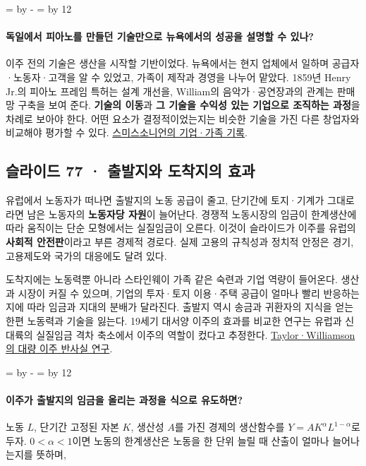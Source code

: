 \documentclass[10pt,a4paper]{article}
\newcommand{\ReserveQuestionSpace}{%
  \par\begingroup
  \dimen0=\pagegoal \advance\dimen0 by -\pagetotal
  \dimen2=\baselineskip \multiply\dimen2 by 12
  \ifdim\dimen0<\dimen2 \newpage\fi
  \endgroup}
\begin{document}
\ReserveQuestionSpace
\paragraph{독일에서 피아노를 만들던 기술만으로 뉴욕에서의 성공을 설명할 수 있나?}
이주 전의 기술은 생산을 시작할 기반이었다. 뉴욕에서는 현지 업체에서 일하며 공급자·노동자·고객을 알 수 있었고, 가족이 제작과 경영을 나누어 맡았다. 1859년 Henry Jr.의 피아노 프레임 특허는 설계 개선을, William의 음악가·공연장과의 관계는 판매망 구축을 보여 준다. \textbf{기술의 이동}과 \textbf{그 기술을 수익성 있는 기업으로 조직하는 과정}을 차례로 보아야 한다. 어떤 요소가 결정적이었는지는 비슷한 기술을 가진 다른 창업자와 비교해야 평가할 수 있다. \href{https://sirismm.si.edu/EADpdfs/NMAH.AC.0178.pdf}{스미스소니언의 기업·가족 기록}.\par

\subsection{슬라이드 77 · 출발지와 도착지의 효과}
유럽에서 노동자가 떠나면 출발지의 노동 공급이 줄고, 단기간에 토지·기계가 그대로라면 남은 노동자의 \textbf{노동자당 자원}이 늘어난다. 경쟁적 노동시장의 임금이 한계생산에 따라 움직이는 단순 모형에서는 실질임금이 오른다. 이것이 슬라이드가 이주를 유럽의 \textbf{사회적 안전판}이라고 부른 경제적 경로다. 실제 고용의 규칙성과 정치적 안정은 경기, 고용제도와 국가의 대응에도 달려 있다.\par

도착지에는 노동력뿐 아니라 스타인웨이 가족 같은 숙련과 기업 역량이 들어온다. 생산과 시장이 커질 수 있으며, 기업의 투자·토지 이용·주택 공급이 얼마나 빨리 반응하는지에 따라 임금과 지대의 분배가 달라진다. 출발지 역시 송금과 귀환자의 지식을 얻는 한편 노동력과 기술을 잃는다. 19세기 대서양 이주의 효과를 비교한 연구는 유럽과 신대륙의 실질임금 격차 축소에서 이주의 역할이 컸다고 추정한다. \href{https://www.nber.org/papers/w4711}{Taylor·Williamson의 대량 이주 반사실 연구}.\par

\ReserveQuestionSpace
\paragraph{이주가 출발지의 임금을 올리는 과정을 식으로 유도하면?}
노동 $L$, 단기간 고정된 자본 $K$, 생산성 $A$를 가진 경제의 생산함수를 $Y=AK^{\alpha}L^{1-\alpha}$로 두자. $0<\alpha<1$이면 노동의 한계생산은 노동을 한 단위 늘릴 때 산출이 얼마나 늘어나는지를 뜻하며,\par
\end{document}
